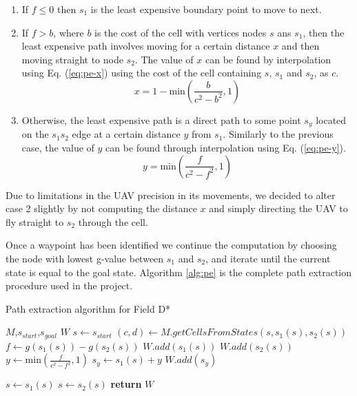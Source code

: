 \begin{enumerate}
	\item If $f \le 0$ then $s_1$ is the least expensive boundary point to move to next. 
	\item If $f > b$, where $b$ is the cost of the cell with vertices nodes $s$ ans $s_1$, then
		the least expensive path involves moving for a certain distance $x$ and then moving
		straight to node $s_2$. The value of $x$ can be found by interpolation using Eq. (\ref{eq:pe-x})
		using the cost of the cell containing $s$, $s_1$ and $s_2$, as $c$.
		\begin{equation}
			x = 1 - \mathrm{min}\left(\frac{b}{c^2 - b^2},1\right)
			\label{eq:pe-x}
		\end{equation}
	\item Otherwise, the least expensive path is a direct path to some point $s_y$ located on the 
		$s_1s_2$ edge at a certain distance $y$ from $s_1$. Similarly to the previous case,
		the value of $y$ can be found through interpolation using Eq. (\ref{eq:pe-y}).
		\begin{equation}
			y = \mathrm{min}\left(\frac{f}{c^2 - f^2},1\right)
			\label{eq:pe-y}
		\end{equation}
\end{enumerate}

Due to limitations in the UAV precision in its movements, we decided to alter case 2 slightly by
not computing the distance $x$ and simply directing the UAV to fly straight to $s_2$ through the 
cell. 

Once a waypoint has been identified we continue the computation by choosing the node with lowest
g-value between $s_1$ and $s_2$, and iterate until the current state is equal to the goal state. 
Algorithm \ref{alg:pe} is the complete path extraction procedure used in the project.

\begin{algorithm}
	\algrenewcommand{}
	\algrenewcommand{}
	\caption{Path extraction algorithm for Field D*}\label{alg:pe}
	\begin{algorithmic}[1]
		\Require $M$,$s_{start}$,$s_{goal}$
		\Ensure $W$
		\State $s \gets s_{start}$ 
			\State $(c,d) \gets M.getCellsFromStates(s,s_1(s),s_2(s))$
			\State $f \gets g(s_1(s)) - g(s_2(s))$ 
				\State $W.add(s_1(s))$ 
				\State $W.add(s_2(s))$
			\Else
				\State $y \gets \mathrm{min}\left(\frac{f}{c^2 - f^2},1\right)$ 
				\State $s_y \gets s_1(s) + y$
				\State $W.add(s_y)$
			\EndIf

			\State $s \gets s_1(s)$
			\Else
			\State $s \gets s_2(s)$
			\EndIf
		\EndWhile
		\State \textbf{return} $W$
		\EndFunction
	\end{algorithmic}
\end{algorithm}

